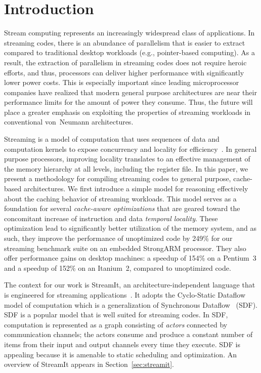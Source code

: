 \section{Introduction}


Stream computing represents an increasingly widespread class of
applications. In streaming codes, there is an abundance of parallelism that
is easier to extract compared to traditional desktop workloads (e.g.,
pointer-based computing). As a result, the extraction of parallelism
in streaming codes does not require heroic efforts, and thus,
processors can deliver higher performance with significantly lower
power costs. This is especially important since
leading microprocessor companies have realized that modern general
purpose architectures are near their  performance limits for  the
amount of power they consume. Thus, the future will place a greater
emphasis on exploiting the properties of streaming workloads in
conventional von~Neumann architectures.

Streaming is a model of computation that uses sequences of data
and computation kernels to expose concurrency and locality for
efficiency~\cite{wss}. In general purpose processors, improving locality 
translates to an effective management of the memory hierarchy at all
levels, including the register file. In this paper, we present a
methodology for compiling streaming codes to general purpose,
cache-based architectures. We first introduce a simple model for
reasoning effectively about the caching behavior of streaming
workloads. This model serves as a foundation for several {\it cache-aware
optimizations} that are geared toward the concomitant increase of instruction
and data {\it temporal locality}. These
optimization lead to significantly better utilization of the memory
system, and as such, they improve the performance of unoptimized code
by 249\% for our streaming benchmark suite on an embedded StrongARM 
processor.   They also offer performance gains on desktop machines:  
a speedup of 154\% on a Pentium~3 and a speedup of 152\% on an Itanium~2,
compared to unoptimized code.


The context for our work is StreamIt, an architecture-independent
language that is engineered for streaming
applications~\cite{streamitcc}. It adopts the 
Cyclo-Static Dataflow~\cite{BELP96} model of computation which is a
generalization of Synchronous Dataflow~\cite{LM87-i} (SDF).  
SDF is a popular  model that  is well suited for
streaming codes. In SDF, computation is represented as a graph
consisting of {\it  actors} connected by communication channels; the
actors consume  and produce a constant number  of items from their
input and output  channels every time they execute. SDF is appealing
because it is amenable to static scheduling and
optimization. An overview of StreamIt appears in Section~\ref{sec:streamit}.


